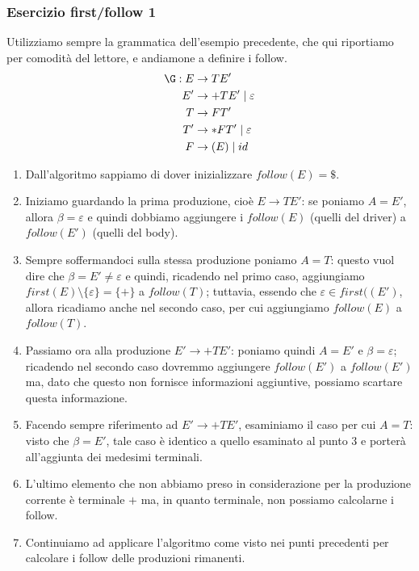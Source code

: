\documentclass[class=book, crop=false, oneside, 12pt]{standalone}
\begin{document}
\subsubsection{Esercizio first/follow 1}
\label{first-follow-ex-1}
Utilizziamo sempre la grammatica dell'esempio precedente, che qui riportiamo per comodità del lettore, e andiamone a definire i follow.
\begin{align*}
    \G: E &\rightarrow TE' \\
    E' &\rightarrow +TE' \mid \varepsilon \\
    T &\rightarrow FT' \\
    T' &\rightarrow *FT' \mid \varepsilon\\
    F &\rightarrow (E) \mid id
\end{align*}
\begin{enumerate}
    \item Dall'algoritmo sappiamo di dover inizializzare \(follow(E) = \$\).
    \item Iniziamo guardando la prima produzione, cioè \(E \rightarrow TE'\): se poniamo \(A = E'\), allora \(\beta = \varepsilon\) e quindi dobbiamo aggiungere i \(follow(E)\) (quelli del driver) a \(follow(E')\) (quelli del body).
    \item Sempre soffermandoci sulla stessa produzione poniamo \(A = T\): questo vuol dire che \(\beta = E' \neq \varepsilon\) e quindi, ricadendo nel primo caso, aggiungiamo \(first(E) \setminus \{\varepsilon\} = \{+\}\) a \(follow(T)\); tuttavia, essendo che \(\varepsilon \in first((E')\), allora ricadiamo anche nel secondo caso, per cui aggiungiamo \(follow(E)\) a \(follow(T)\).
    \item Passiamo ora alla produzione \(E' \rightarrow +TE'\): poniamo quindi \(A = E'\) e \(\beta = \varepsilon\); ricadendo nel secondo caso dovremmo aggiungere \(follow(E')\) a \(follow(E')\) ma, dato che questo non fornisce informazioni aggiuntive, possiamo scartare questa informazione.
    \item Facendo sempre riferimento ad \(E' \rightarrow +TE'\), esaminiamo il caso per cui \(A = T\): visto che \(\beta = E'\), tale caso è identico a quello esaminato al punto 3 e porterà all'aggiunta dei medesimi terminali.
    \item L'ultimo elemento che non abbiamo preso in considerazione per la produzione corrente è terminale \(+\) ma, in quanto terminale, non possiamo calcolarne i follow.
    \item Continuiamo ad applicare l'algoritmo come visto nei punti precedenti per calcolare i follow delle produzioni rimanenti.
\end{enumerate}
\end{document}
